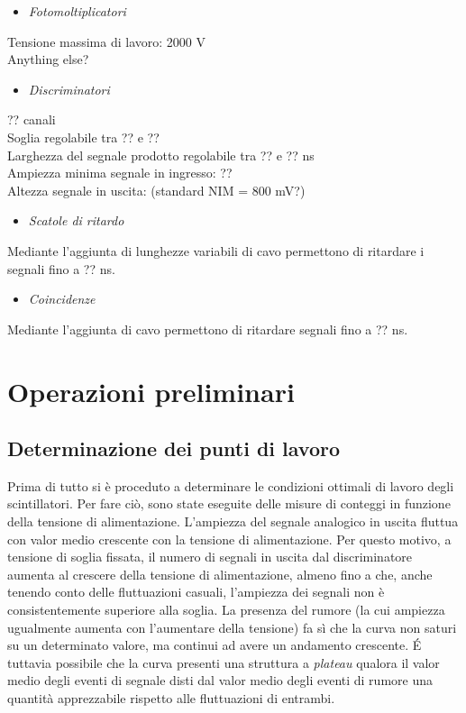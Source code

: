 \documentclass[11pt]{article}
\begin{document}
\begin{itemize}
\item \textit{Fotomoltiplicatori}
\end{itemize}
Tensione massima di lavoro: 2000 V \\
Anything else?

\begin{itemize}
\item \textit{Discriminatori}
\end{itemize}
?? canali \\
Soglia regolabile tra ?? e ?? \\
Larghezza del segnale prodotto regolabile tra ?? e ?? ns \\
Ampiezza minima segnale in ingresso: ?? \\
Altezza segnale in uscita: (standard NIM = 800 mV?) \\

\begin{itemize}
\item \textit{Scatole di ritardo}
\end{itemize}
Mediante l'aggiunta di lunghezze variabili di cavo permettono di ritardare i segnali fino a ?? ns.

\begin{itemize}
\item \textit{Coincidenze}
\end{itemize}
Mediante l'aggiunta di cavo permettono di ritardare segnali fino a ?? ns.

\section{Operazioni preliminari}
\subsection{Determinazione dei punti di lavoro}
Prima di tutto si è proceduto a determinare le condizioni ottimali di lavoro degli scintillatori. Per fare ciò, sono state eseguite delle misure di conteggi in funzione della tensione di alimentazione. L'ampiezza del segnale analogico in uscita fluttua con valor medio crescente con la tensione di alimentazione. Per questo motivo, a tensione di soglia fissata, il numero di segnali in uscita dal discriminatore aumenta al crescere della tensione di alimentazione, almeno fino a che, anche tenendo conto delle fluttuazioni casuali, l'ampiezza dei segnali non è consistentemente superiore alla soglia. La presenza del rumore (la cui ampiezza ugualmente aumenta con l'aumentare della tensione) fa sì che la curva non saturi su un determinato valore, ma continui ad avere un andamento crescente.
\'E tuttavia possibile che la curva presenti una struttura a \textit{plateau} qualora il valor medio degli eventi di segnale disti dal valor medio degli eventi di rumore una quantità apprezzabile rispetto alle fluttuazioni di entrambi. \newpage
\end{document}
